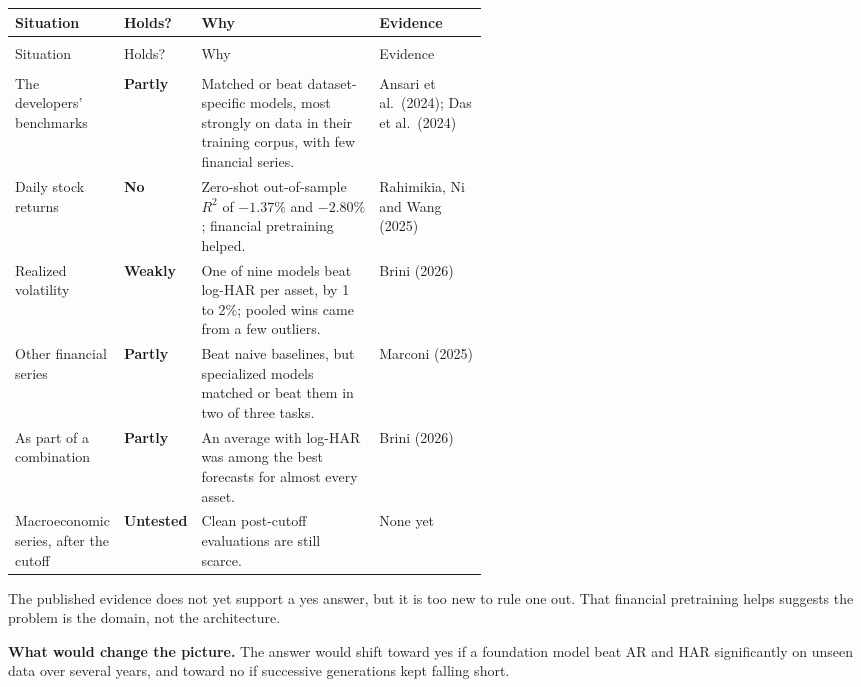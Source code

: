 {\small
\begin{longtable}{@{}>{\raggedright\arraybackslash}p{0.19\linewidth}>{\raggedright\arraybackslash}p{0.13\linewidth}>{\raggedright\arraybackslash}p{}>{\raggedright\arraybackslash}p{0.23\linewidth}@{}}
\toprule
Situation & Holds? & Why & Evidence \\
\midrule
\endfirsthead
\multicolumn{4}{@{}l}{\emph{(continued)}} \\
\toprule
Situation & Holds? & Why & Evidence \\
\midrule
\endhead
\midrule
\multicolumn{4}{r@{}}{\emph{(continued on the next page)}} \\
\endfoot
\bottomrule
\endlastfoot
The developers' benchmarks & \textbf{Partly} & Matched or beat dataset-specific models, most strongly on data in their training corpus, with few financial series. & Ansari et al.\ (2024); Das et al.\ (2024) \\*
\addlinespace[3pt]
Daily stock returns & \textbf{No} & Zero-shot out-of-sample $R^2$ of $-1.37\%$ and $-2.80\%$; financial pretraining helped. & Rahimikia, Ni and Wang (2025) \\
\addlinespace[3pt]
Realized volatility & \textbf{Weakly} & One of nine models beat log-HAR per asset, by 1 to 2\%; pooled wins came from a few outliers. & Brini (2026) \\
\addlinespace[3pt]
Other financial series & \textbf{Partly} & Beat naive baselines, but specialized models matched or beat them in two of three tasks. & Marconi (2025) \\
\addlinespace[3pt]
As part of a combination & \textbf{Partly} & An average with log-HAR was among the best forecasts for almost every asset. & Brini (2026) \\*
\addlinespace[3pt]
Macroeconomic series, after the cutoff & \textbf{Untested} & Clean post-cutoff evaluations are still scarce. & None yet \\
\end{longtable}
\addtocounter{table}{-1}%
}

The published evidence does not yet support a yes answer, but it is too new to rule one out. That financial pretraining helps suggests the problem is the domain, not the architecture.

\textbf{What would change the picture.} The answer would shift toward yes if a foundation model beat AR and HAR significantly on unseen data over several years, and toward no if successive generations kept falling short.

